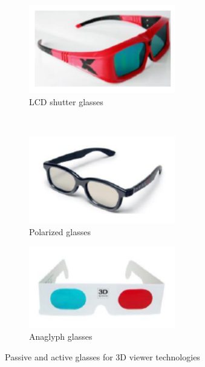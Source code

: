 \begin{figure}[h!]
\centering
\begin{subfigure}[]{0.4\textwidth}
\centering
\includegraphics[width=0.7\textwidth]{./img/glass1.png}
\caption{\scriptsize{LCD shutter glasses}}
\end{subfigure}%
~ %
\begin{subfigure}[]{0.4\textwidth}
\centering
\includegraphics[width=0.7\textwidth]{./img/glass2.png}
\caption{\scriptsize{Polarized glasses}}
\end{subfigure} 
\begin{subfigure}[]{0.4\textwidth}
\centering
\includegraphics[width=0.7\textwidth]{./img/glass3.png}
\caption{\scriptsize{Anaglyph glasses}}
\label{glass}
\end{subfigure}%
\caption{\small{Passive and active glasses for 3D viewer technologies}}
\end{figure}
